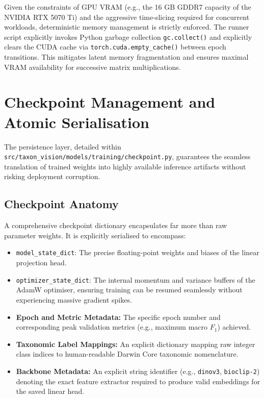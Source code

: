 Given the constraints of GPU VRAM (e.g., the 16 GB GDDR7 capacity of the NVIDIA RTX 5070 Ti) and the aggressive time-slicing required for concurrent workloads, deterministic memory management is strictly enforced. The runner script explicitly invokes Python garbage collection \texttt{gc.collect()} and explicitly clears the CUDA cache via \texttt{torch.cuda.empty\_cache()} between epoch transitions. This mitigates latent memory fragmentation and ensures maximal VRAM availability for successive matrix multiplications.

\section{Checkpoint Management and Atomic Serialisation}
\label{sec:checkpoint_management}

The persistence layer, detailed within \texttt{src/taxon\_vision/models/training/checkpoint.py}, guarantees the seamless translation of trained weights into highly available inference artifacts without risking deployment corruption.

\subsection{Checkpoint Anatomy}

A comprehensive checkpoint dictionary encapsulates far more than raw parameter weights. It is explicitly serialised to encompass:

\begin{itemize}
    \item \texttt{model\_state\_dict}: The precise floating-point weights and biases of the linear projection head.
    \item \texttt{optimizer\_state\_dict}: The internal momentum and variance buffers of the AdamW optimiser, ensuring training can be resumed seamlessly without experiencing massive gradient spikes.
    \item \textbf{Epoch and Metric Metadata:} The specific epoch number and corresponding peak validation metrics (e.g., maximum macro $F_1$) achieved.
    \item \textbf{Taxonomic Label Mappings:} An explicit dictionary mapping raw integer class indices to human-readable Darwin Core taxonomic nomenclature.
    \item \textbf{Backbone Metadata:} An explicit string identifier (e.g., \texttt{dinov3}, \texttt{bioclip-2}) denoting the exact feature extractor required to produce valid embeddings for the saved linear head.
\end{itemize}

